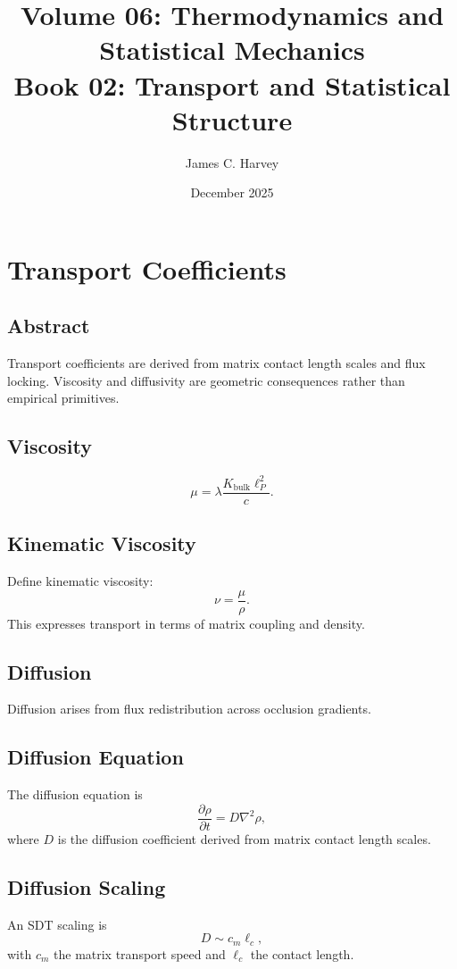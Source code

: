 \documentclass[12pt]{book}
\title{Volume 06: Thermodynamics and Statistical Mechanics \\ Book 02: Transport and Statistical Structure}
\author{James C. Harvey}
\date{December 2025}
\begin{document}
\maketitle
\tableofcontents

\chapter{Transport Coefficients}

\section*{Abstract}
Transport coefficients are derived from matrix contact length scales and flux locking. Viscosity and
diffusivity are geometric consequences rather than empirical primitives.

\section{Viscosity}
\begin{equation}
\mu = \lambda \frac{K_{\text{bulk}} \ell_P^2}{c}.
\end{equation}

\section{Kinematic Viscosity}
Define kinematic viscosity:
\begin{equation}
\nu = \frac{\mu}{\rho}.
\end{equation}
This expresses transport in terms of matrix coupling and density.

\section{Diffusion}
Diffusion arises from flux redistribution across occlusion gradients.

\section{Diffusion Equation}
The diffusion equation is
\begin{equation}
\frac{\partial \rho}{\partial t} = D \nabla^2 \rho,
\end{equation}
where $D$ is the diffusion coefficient derived from matrix contact length scales.

\section{Diffusion Scaling}
An SDT scaling is
\begin{equation}
D \sim c_m \ell_c,
\end{equation}
with $c_m$ the matrix transport speed and $\ell_c$ the contact length.
\end{document}
